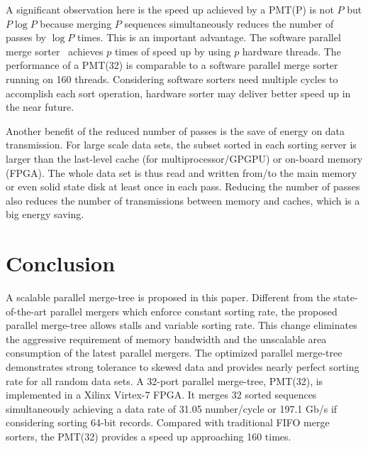\documentclass[10pt, conference]{IEEEtran}
\begin{document}
A significant observation here is the speed up achieved by a PMT(P) is not $P$ but $P \log P$
because merging $P$ sequences simultaneously reduces the number of passes by $\log P$ times.
This is an important advantage.
The software parallel merge sorter~\cite{Odeh2012} achieves $p$ times of speed up by using $p$ hardware threads.
The performance of a PMT(32) is comparable to a software parallel merge sorter running on 160 threads.
Considering software sorters need multiple cycles to accomplish each sort operation, hardware sorter may deliver better speed up in the near future.

Another benefit of the reduced number of passes is the save of energy on data transmission.
For large scale data sets, the subset sorted in each sorting server is larger than the last-level cache (for multiprocessor/GPGPU) or on-board memory (FPGA).
The whole data set is thus read and written from/to the main memory or even solid state disk at least once in each pass.
Reducing the number of passes also reduces the number of transmissions between memory and caches, which is a big energy saving.

\section{Conclusion}
A scalable parallel merge-tree is proposed in this paper.
Different from the state-of-the-art parallel mergers which enforce constant sorting rate,
the proposed parallel merge-tree allows stalls and variable sorting rate.
This change eliminates the aggressive requirement of memory bandwidth and the unscalable area consumption of the latest parallel mergers.
The optimized parallel merge-tree demonstrates strong tolerance to skewed data and provides nearly perfect sorting rate for all random data sets. 
A 32-port parallel merge-tree, PMT(32), is implemented in a Xilinx Virtex-7 FPGA.
It merges 32 sorted sequences simultaneously achieving a data rate of 31.05 number/cycle or 197.1 Gb/s if considering sorting 64-bit records.
Compared with traditional FIFO merge sorters, the PMT(32) provides a speed up approaching 160 times.





\end{document}
